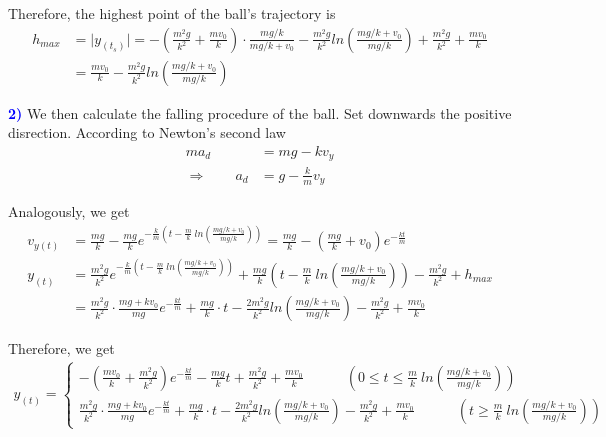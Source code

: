 \documentclass[12pt,a4paper]{article}
\begin{document}
\par Therefore, the highest point of the ball's trajectory is
\begin{align*}
	h_{max} &= \lvert y_{(t_s)}\rvert = -\left( \frac{m^2g}{k^2} + \frac{mv_0}{k} \right)\cdot \frac{mg/k}{mg/k + v_0} - \frac{m^2g}{k^2}ln \left( \frac{mg/k + v_0}{mg/k} \right) + \frac{m^2g}{k^2} + \frac{mv_0}{k}\\ &= \frac{mv_0}{k} - \frac{m^2g}{k^2}ln \left( \frac{mg/k + v_0}{mg/k} \right) 
\end{align*}
\vspace{4mm}
\par \textbf{\textcolor{blue}{2)}} We then calculate the falling procedure of the ball. Set downwards the positive disrection. According to Newton's second law
\begin{align*}
	ma_d &= mg - kv_y\\
\Rightarrow \quad \quad a_d &= g - \frac{k}{m}v_y
\end{align*}
\par Analogously, we get
\begin{align*}
	v_{y(t)} &= \frac{mg}{k} - \frac{mg}{k}e^{-\frac{k}{m}(t-\frac{m}{k}\ ln \left( \frac{mg/k + v_0}{mg/k} \right))} = \frac{mg}{k} - (\frac{mg}{k}+v_0)e^{-\frac{kt}{m}}\\
	y_{(t)} &= \frac{m^2g}{k^2}e^{-\frac{k}{m}(t-\frac{m}{k}\ ln \left( \frac{mg/k + v_0}{mg/k} \right))} + \frac{mg}{k}(t-\frac{m}{k}\ ln \left( \frac{mg/k + v_0}{mg/k} \right)) - \frac{m^2g}{k^2} + h_{max}\\
	&= \frac{m^2g}{k^2}\cdot \frac{mg+kv_0}{mg} e^{-\frac{kt}{m}} + \frac{mg}{k} \cdot t - \frac{2m^2g}{k^2}ln\left(\frac{mg/k+v_0}{mg/k} \right) - \frac{m^2g}{k^2} + \frac{mv_0}{k}
\end{align*}

\par Therefore, we get
\begin{align*}
	y_{(t)} = 
	\left\{	\begin{array}{c}
		-\left( \frac{mv_0}{k} + \frac{m^2g}{k^2} \right) e^{-\frac{kt}{m}} - \frac{mg}{k}t + \frac{m^2g}{k^2} + \frac{mv_0}{k}\quad \quad \quad (0 \leq t \leq \frac{m}{k}\ ln \left( \frac{mg/k + v_0}{mg/k} \right)) \\
		\frac{m^2g}{k^2}\cdot \frac{mg+kv_0}{mg} e^{-\frac{kt}{m}} + \frac{mg}{k} \cdot t - \frac{2m^2g}{k^2}ln\left(\frac{mg/k+v_0}{mg/k} \right) - \frac{m^2g}{k^2} + \frac{mv_0}{k}\quad \quad \quad (t \geq \frac{m}{k}\ ln \left( \frac{mg/k + v_0}{mg/k} \right))
	\end{array}	\right.
\end{align*}
\end{document}
